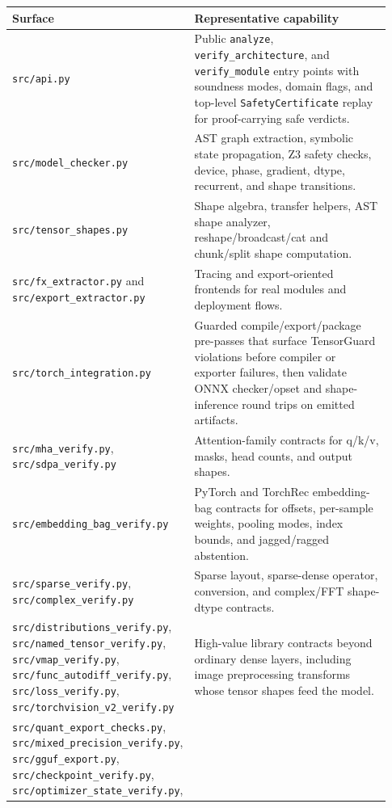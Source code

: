 \documentclass[11pt]{article}
\newcommand{\tg}{TensorGuard}
\begin{document}
\begin{longtable}{|p{0.24\linewidth}|p{0.69\linewidth}|}
\hline
\textbf{Surface} & \textbf{Representative capability} \\
\hline
\texttt{src/api.py} &
Public \texttt{analyze}, \texttt{verify\_architecture}, and \texttt{verify\_module}
entry points with soundness modes, domain flags, and top-level
\texttt{SafetyCertificate} replay for proof-carrying safe verdicts. \\
\hline
\texttt{src/model\_checker.py} &
AST graph extraction, symbolic state propagation, Z3 safety checks, device,
phase, gradient, dtype, recurrent, and shape transitions. \\
\hline
\texttt{src/tensor\_shapes.py} &
Shape algebra, transfer helpers, AST shape analyzer, reshape/broadcast/cat and
chunk/split shape computation. \\
\hline
\texttt{src/fx\_extractor.py} and \texttt{src/export\_extractor.py} &
Tracing and export-oriented frontends for real modules and deployment flows. \\
\hline
\texttt{src/torch\_integration.py} &
Guarded compile/export/package pre-passes that surface \tg{} violations before
compiler or exporter failures, then validate ONNX checker/opset and
shape-inference round trips on emitted artifacts. \\
\hline
\texttt{src/mha\_verify.py}, \texttt{src/sdpa\_verify.py} &
Attention-family contracts for q/k/v, masks, head counts, and output shapes. \\
\hline
\texttt{src/embedding\_bag\_verify.py} &
PyTorch and TorchRec embedding-bag contracts for offsets, per-sample weights,
pooling modes, index bounds, and jagged/ragged abstention. \\
\hline
\texttt{src/sparse\_verify.py}, \texttt{src/complex\_verify.py} &
Sparse layout, sparse-dense operator, conversion, and complex/FFT shape-dtype
contracts. \\
\hline
\texttt{src/distributions\_verify.py}, \texttt{src/named\_tensor\_verify.py},
\texttt{src/vmap\_verify.py}, \texttt{src/func\_autodiff\_verify.py},
\texttt{src/loss\_verify.py}, \texttt{src/torchvision\_v2\_verify.py} &
High-value library contracts beyond ordinary dense layers, including image
preprocessing transforms whose tensor shapes feed the model. \\
\hline
\texttt{src/quant\_export\_checks.py}, \texttt{src/mixed\_precision\_verify.py},
\texttt{src/gguf\_export.py}, \texttt{src/checkpoint\_verify.py},
\texttt{src/optimizer\_state\_verify.py},

\end{longtable}
\end{document}
